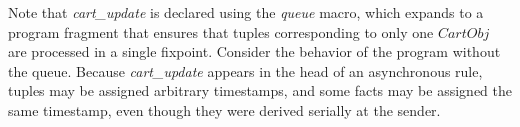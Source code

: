 Note that 
{\em cart\_update} is declared using the {\em queue} macro, which expands to
a program fragment that ensures that tuples corresponding to only one $CartObj$
are processed in a single fixpoint. 
Consider the behavior of the program without the queue.  Because {\em
cart\_update} appears in the head of an asynchronous rule,
 tuples may be assigned arbitrary timestamps, and some
 facts may be assigned the same timestamp, even though
they were derived serially at the sender.  





